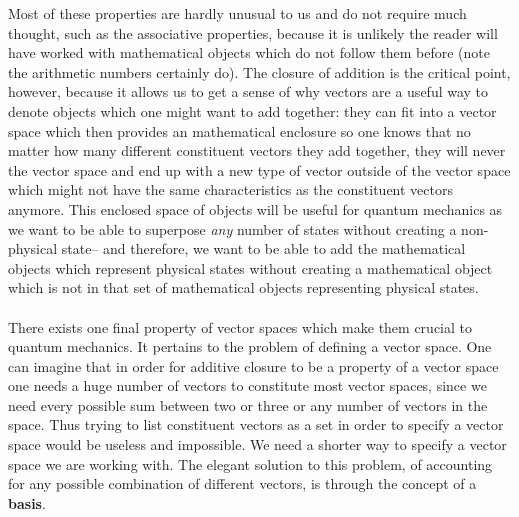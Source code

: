Most of these properties are hardly unusual to us and do not require much thought, such as the associative properties, because it is unlikely the reader will have worked with mathematical objects which do not follow them before (note the arithmetic numbers certainly do). The closure of addition is the critical point, however, because it allows us to get a sense of why vectors are a useful way to denote objects which one might want to add together: they can fit into a vector space which then provides an mathematical enclosure so one knows that no matter how many different constituent vectors they add together, they will never  the vector space and end up with a new type of vector outside of the vector space which might not have the same characteristics as the constituent vectors anymore. This enclosed space of objects will be useful for quantum mechanics as we want to be able to superpose \textit{any} number of states without creating a non-physical state-- and therefore, we want to be able to add the mathematical objects which represent physical states without creating a mathematical object which is not in that set of mathematical objects representing physical states.
\\\\
There exists one final property of vector spaces which make them crucial to quantum mechanics. It pertains to the problem of defining a vector space. One can imagine that in order for additive closure to be a property of a vector space one needs a huge number of vectors to constitute most vector spaces, since we need every possible sum between two or three or any number of vectors in the space. Thus trying to list constituent vectors as a set in order to specify a vector space would be useless and impossible. We need a shorter way to specify a vector space we are working with. The elegant solution to this problem, of accounting for any possible combination of different vectors, is through the concept of a \textbf{basis}.
